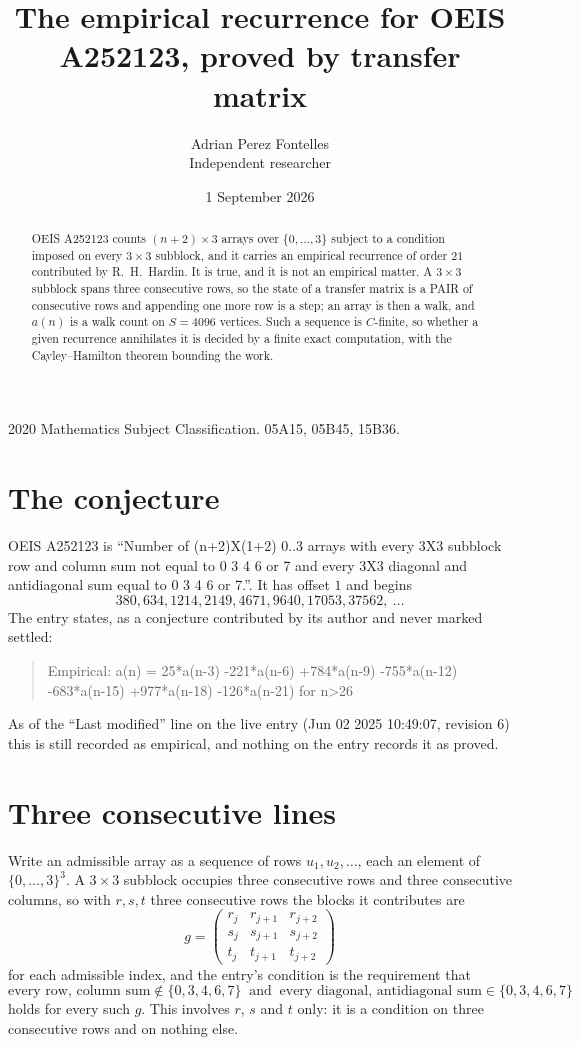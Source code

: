 \documentclass[11pt,a4paper]{article}
\title{The empirical recurrence for OEIS A252123, proved by transfer matrix}
\author{Adrian Perez Fontelles\\ \small Independent researcher}
\date{1 September 2026}
\theoremstyle{plain}
\theoremstyle{definition}
\begin{document}
\maketitle

\begin{abstract}
OEIS A252123 counts $(n+2)\times3$ arrays over $\{0,\dots,3\}$ subject to a condition imposed on
every $3\times3$ subblock, and it carries an empirical recurrence of order $21$
contributed by R.~H.~Hardin. It is true, and it is not an empirical matter. A $3\times3$
subblock spans three consecutive rows, so the state of a transfer matrix is a PAIR of
consecutive rows and appending one more row is a step; an array is then a walk, and
$a(n)$ is a walk count on $S=4096$ vertices. Such a sequence is $C$-finite, so whether a given
recurrence annihilates it is decided by a finite exact computation, with the Cayley--Hamilton
theorem bounding the work.
\end{abstract}

\noindent\small 2020 Mathematics Subject Classification. 05A15, 05B45, 15B36.\normalsize

\section{The conjecture}

OEIS A252123 is ``Number of (n+2)X(1+2) 0..3 arrays with every 3X3 subblock row and column sum not equal to 0 3 4 6 or 7 and every 3X3 diagonal and antidiagonal sum equal to 0 3 4 6 or 7.''. It has offset $1$ and begins
\[
380, 634, 1214, 2149, 4671, 9640, 17053, 37562,\ \dots
\]
The entry states, as a conjecture contributed by its author and never marked settled:
\begin{quote}
Empirical: a(n) = 25*a(n-3) -221*a(n-6) +784*a(n-9) -755*a(n-12) -683*a(n-15) +977*a(n-18) -126*a(n-21) for n>26
\end{quote}
As of the ``Last modified'' line on the live entry (Jun 02 2025 10:49:07, revision 6) this is still
recorded as empirical, and nothing on the entry records it as proved.

\section{Three consecutive lines}

Write an admissible array as a sequence of rows $u_1,u_2,\dots$, each an element of
$\{0,\dots,3\}^{3}$. A $3\times3$ subblock occupies three consecutive rows and
three consecutive columns, so with $r,s,t$ three consecutive rows the blocks it
contributes are
\[
g=\begin{pmatrix}r_j&r_{j+1}&r_{j+2}\\ s_j&s_{j+1}&s_{j+2}\\ t_j&t_{j+1}&t_{j+2}\end{pmatrix}
\]
for each admissible index, and the entry's condition is the requirement that
\[
\text{every row, column sum} \notin \{0,3,4,6,7\}\ \text{ and }\ \text{every diagonal, antidiagonal sum} \in \{0,3,4,6,7\}
\]
holds for every such $g$. This involves $r$, $s$ and $t$ only: it is a condition on
three consecutive rows and on nothing else.
\end{document}
